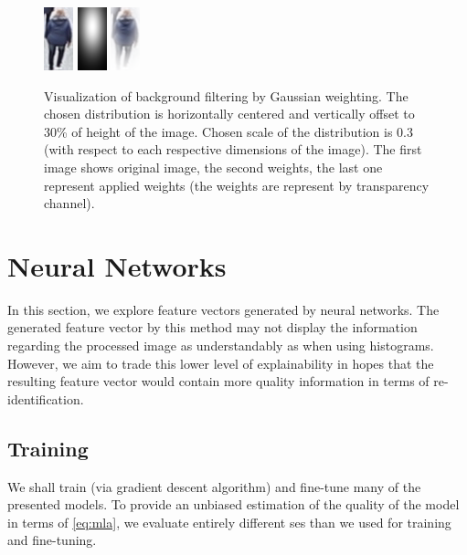 \begin{figure}
    \centering
    \includegraphics{img/background_filter/1_original.png} \hspace{1cm} \includegraphics{img/background_filter/weights.png} \hspace{1cm}
    \includegraphics{img/background_filter/weights_applied.png}
    \caption[Visualization of background filtering by Gaussian weighting]{Visualization of background filtering by Gaussian weighting. The chosen distribution is horizontally centered and vertically offset to 30\% of height of the image. Chosen scale of the distribution is 0.3 (with respect to each respective dimensions of the image). The first image shows original image, the second weights, the last one represent applied weights (the weights are represent by transparency channel).}
    \label{fig:gaussian_weighting}
\end{figure}


\section{Neural Networks}

In this section, we explore feature vectors generated by neural networks. The generated feature vector by this method may not display the information regarding the processed image as understandably as when using histograms. However, we aim to trade this lower level of explainability in hopes that the resulting feature vector would contain more quality information in terms of re-identification.

\subsection{Training}

We shall train (via gradient descent algorithm) and fine-tune many of the presented models. To provide an unbiased estimation of the quality of the model in terms of \autoref{eq:mla}, we evaluate entirely different \gls{ses} than we used for training and fine-tuning.


